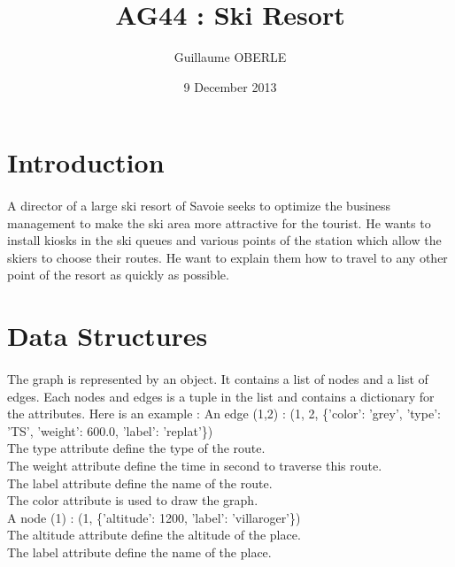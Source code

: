 \documentclass{article}
\title{AG44 : Ski Resort}
\author{Guillaume OBERLE}
\date{9 December 2013}
\begin{document}
\maketitle

\section{Introduction}
    \paragraph{}
        A director of a large ski resort of Savoie seeks to optimize the business management to make the ski area more attractive for the tourist. He wants to install kiosks in the ski queues and various points of the station which allow the skiers to choose their routes. He want to explain them how to travel to any other point of the resort as quickly as possible. 

\section{Data Structures}
    \paragraph{}
        The graph is represented by an object. It contains a list of nodes and a list of edges. Each nodes and edges is a tuple in the list and contains a dictionary for the attributes. Here is an example :
        \newline{}
        \newline{}
        An edge (1,2) : (1, 2, \{'color': 'grey', 'type': 'TS', 'weight': 600.0, 'label': 'replat'\})\\
        The type attribute define the type of the route.\\
        The weight attribute define the time in second to traverse this route.\\
        The label attribute define the name of the route.\\
        The color attribute is used to draw the graph.\\
        \newline{}
        A node (1) : (1, \{'altitude': 1200, 'label': 'villaroger'\})\\
        The altitude attribute define the altitude of the place.\\
        The label attribute define the name of the place.
\end{document}
